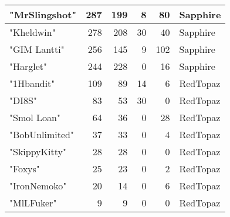 \documentclass{article}
\begin{document}
\begin{table}[htbp]
\begin{tabular}{|l|r|r|r|r|l|}
"MrSlingshot" & 287 & 199 & 8 & 80 & Sapphire \\ \hline
"Kheldwin" & 278 & 208 & 30 & 40 & Sapphire \\ \hline
"GIM Lantti" & 256 & 145 & 9 & 102 & Sapphire \\ \hline
"Harglet" & 244 & 228 & 0 & 16 & Sapphire \\ \hline
"1Hbandit" & 109 & 89 & 14 & 6 & RedTopaz \\ \hline
"DI8S" & 83 & 53 & 30 & 0 & RedTopaz \\ \hline
"Smol Loan" & 64 & 36 & 0 & 28 & RedTopaz \\ \hline
"BobUnlimited" & 37 & 33 & 0 & 4 & RedTopaz \\ \hline
"SkippyKitty" & 28 & 28 & 0 & 0 & RedTopaz \\ \hline
"Foxys" & 25 & 23 & 0 & 2 & RedTopaz \\ \hline
"IronNemoko" & 20 & 14 & 0 & 6 & RedTopaz \\ \hline
"MlLFuker" & 9 & 9 & 0 & 0 & RedTopaz \\ \hline
\end{tabular}
\end{table}
\end{document}
